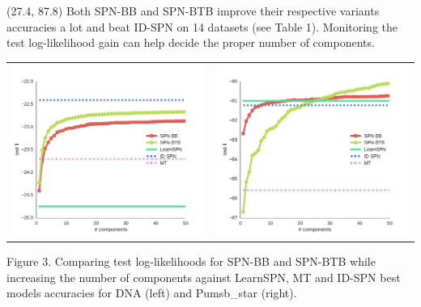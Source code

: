 \documentclass[final]{beamer}
\begin{document}
\begin{frame}{}
  \begin{textblock}{25.2}(27.4, 87.8)
    \footnotesize
    Both \textsf{SPN-BB} and \textsf{SPN-BTB} improve their respective
    variants accuracies a lot and beat \textsf{ID-SPN} on 14 datasets
    (see Table 1). Monitoring the test log-likelihood gain can help
    decide the proper number of components.
    \begin{table}[ht]
      \setlength{\tabcolsep}{30pt}  
      \centering
      \begin{tabular}{c c}
        \includegraphics[width=0.4\linewidth]{figures/curves/pumsb-star.pdf}&\includegraphics[width=0.4\linewidth]{figures/curves/dna.pdf}
      \end{tabular}
    \end{table}
    \vspace{-20pt}
    \begin{center}
      \begin{minipage}[t]{0.9\linewidth}
        \tiny\flushleft
        Figure 3. Comparing test log-likelihoods for \textsf{SPN-BB} and
        \textsf{SPN-BTB} while increasing the number of components against \textsf{LearnSPN}, \textsf{MT} and
        \textsf{ID-SPN} best models accuracies for DNA (left) and
        Pumsb\_star (right).
      \end{minipage}
    \end{center}
  \end{textblock}
  
  

\end{frame}
\end{document}
